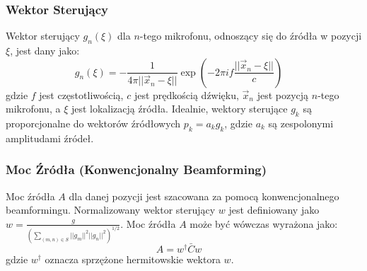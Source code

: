 \documentclass[12pt]{article}
\begin{document}
\subsubsection{Wektor Sterujący}
Wektor sterujący $g_n(\xi)$ dla $n$-tego mikrofonu, odnoszący się do źródła w pozycji $\xi$, jest dany jako:
\begin{equation}
g_n(\xi) = -\frac{1}{4\pi||\vec{x}_n - \xi||} \exp \left( -2\pi i f \frac{||\vec{x}_n - \xi||}{c} \right) \quad \text{}
\end{equation}
gdzie $f$ jest częstotliwością, $c$ jest prędkością dźwięku, $\vec{x}_n$ jest pozycją $n$-tego mikrofonu, a $\xi$ jest lokalizacją źródła. Idealnie, wektory sterujące $g_k$ są proporcjonalne do wektorów źródłowych $p_k = a_k g_k$, gdzie $a_k$ są zespolonymi amplitudami źródeł.

\subsubsection{Moc Źródła (Konwencjonalny Beamforming)}
Moc źródła $A$ dla danej pozycji jest szacowana za pomocą konwencjonalnego beamformingu. Normalizowany wektor sterujący $w$ jest definiowany jako $w = \frac{g}{(\sum_{(m,n)\in S} ||g_m||^2 ||g_n||^2)^{1/2}}$. Moc źródła $A$ może być wówczas wyrażona jako:
\begin{equation}
A = w^\dagger \bar{C} w \quad \text{}
\end{equation}
gdzie $w^\dagger$ oznacza sprzężone hermitowskie wektora $w$.
\end{document}
